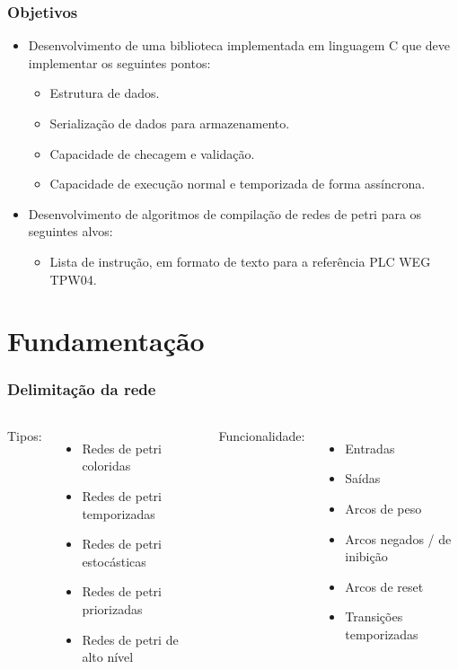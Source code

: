 \documentclass{beamer}
\begin{document}
\begin{frame}
\frametitle{Objetivos}

	\begin{itemize}
		\item Desenvolvimento de uma biblioteca implementada em linguagem C que deve implementar os seguintes pontos: 
		\begin{itemize}
			\item Estrutura de dados.
			\item Serialização de dados para armazenamento.
			\item Capacidade de checagem e validação.
			\item Capacidade de execução normal e temporizada de forma assíncrona.
		\end{itemize}
		
		\item Desenvolvimento de algoritmos de compilação de redes de petri para os seguintes alvos:
		\begin{itemize}
			\item Lista de instrução, em formato de texto para a referência PLC WEG TPW04.
		\end{itemize}
	\end{itemize}

\end{frame}

\section{Fundamentação}

\begin{frame}
\frametitle{Delimitação da rede}
\begin{columns}
	Tipos:
	\begin{itemize}
		\item Redes de petri coloridas
		\item Redes de petri temporizadas
		\item Redes de petri estocásticas
		\item Redes de petri priorizadas
		\item Redes de petri de alto nível
	\end{itemize}
	
	Funcionalidade:
	\begin{itemize}
		\item Entradas 
		\item Saídas 
		\item Arcos de peso 
		\item Arcos negados / de inibição 
		\item Arcos de reset
		\item Transições temporizadas 
	\end{itemize}
\end{columns}
\end{frame}
\end{document}
